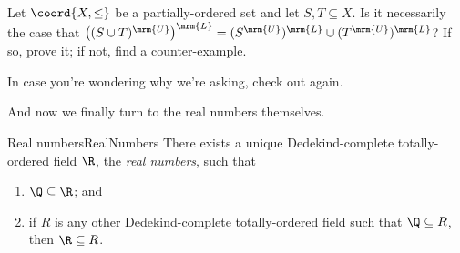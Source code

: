 \begin{exr}{}{}
Let $\coord{X,\leq}$ be a partially-ordered set and let $S,T\subseteq X$.  Is it necessarily the case that $\left( (S\cup T)^{\mrm{U}}\right) ^{\mrm{L}}=(S^{\mrm{U}})^{\mrm{L}}\cup (T^{\mrm{U}})^{\mrm{L}}$?  If so, prove it; if not, find a counter-example.
\begin{rmk}
In case you're wondering why we're asking, check out  again.
\end{rmk}
\end{exr}

And now we finally turn to the real numbers themselves.
\begin{thm}{Real numbers}{RealNumbers}
There exists a unique Dedekind-complete totally-ordered field $\R$, the \emph{real numbers}, such that
\begin{enumerate}
\item $\Q \subseteq \R$; and
\item if $R$ is any other Dedekind-complete totally-ordered field such that $\Q \subseteq R$, then $\R \subseteq R$.
\end{enumerate}


\end{thm}

